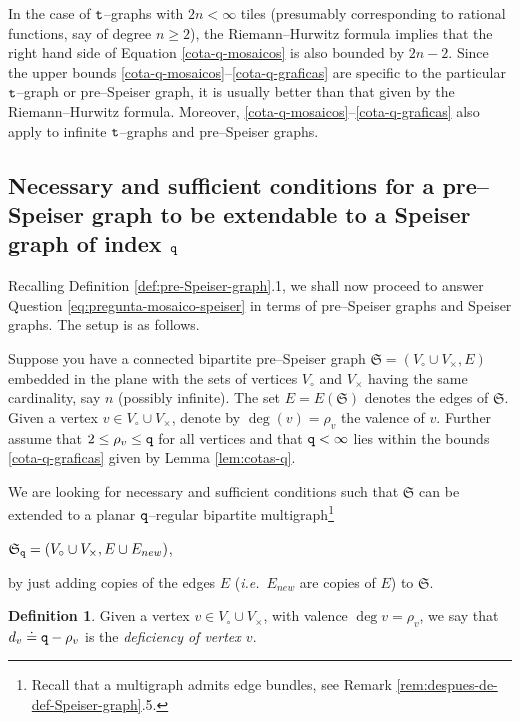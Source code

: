 \documentclass[final,3p,times]{elsarticle}
\theoremstyle{definition}
\newtheorem{definition}[theorem]{Definition}
\begin{document}
In the case of $\tt t$--graphs with $2n<\infty$ tiles 
(presumably corresponding to rational functions, 
say of degree $n\geq 2$), 
the Riemann--Hurwitz formula implies that
the right hand side 
of Equation \eqref{cota-q-mosaicos} 
is also bounded by $2n-2$.
Since the upper bounds
\eqref{cota-q-mosaicos}--\eqref{cota-q-graficas} are specific to the 
particular $\tt t$--graph or pre--Speiser graph, it is usually better than that 
given by the Riemann--Hurwitz formula. 
Moreover, 
\eqref{cota-q-mosaicos}--\eqref{cota-q-graficas}
also apply to infinite $\tt t$--graphs and pre--Speiser graphs.


\subsection{Necessary and sufficient conditions for a pre--Speiser graph to be extendable to a Speiser graph of index $\tt q$}
\label{sec:bipartite-transportation-problem}
Recalling Definition \ref{def:pre-Speiser-graph}.1,
we shall now proceed to answer  
Question \eqref{eq:pregunta-mosaico-speiser}
in terms of pre--Speiser graphs and Speiser graphs.
The setup is as follows.

\noindent
Suppose you have a connected bipartite 
pre--Speiser 
graph $\mathfrak{S}=(V_\circ \cup V_\times, E)$ embedded in the 
plane with the sets of vertices
$V_\circ$ and $V_\times$ having the same cardinality, say 
$n$ (possibly infinite). 
The set $E=E(\mathfrak{S})$ denotes the edges of $\mathfrak{S}$.
Given a vertex $v\in V_\circ \cup V_\times$, denote by $\deg(v) = \rho_v$ the valence of $v$. 
Further assume that $2 \leq \rho_v \leq {\tt q}$ for all vertices and that 
${\tt q}<\infty$ lies within the bounds \eqref{cota-q-graficas} given by Lemma \ref{lem:cotas-q}.

We are looking for necessary and sufficient conditions 
such that $\mathfrak{S}$ can be extended to a 
planar $\tt q$--regular bipartite 
multigraph\footnote{Recall that
a multigraph admits edge bundles, see 
Remark \ref{rem:despues-de-def-Speiser-graph}.5.
}

\centerline{
$\mathfrak{S}_{\tt q} = (V_\circ \cup V_\times, E\cup E_{new})$,
}

\noindent
by just adding copies of the edges $E$ 
(\emph{i.e.}\ $E_{new}$ are copies of $E$) to $\mathfrak{S}$.

\begin{definition}
\label{def:deficiency-neighbors-of-sets-within-part}
Given a vertex $v\in V_\circ \cup V_\times$, with valence $\deg{v}=\rho_v$, 
we say that $d_v \doteq {\tt q}-\rho_v$ is the \emph{deficiency of vertex $v$}.
\end{definition}
 
\end{document}

